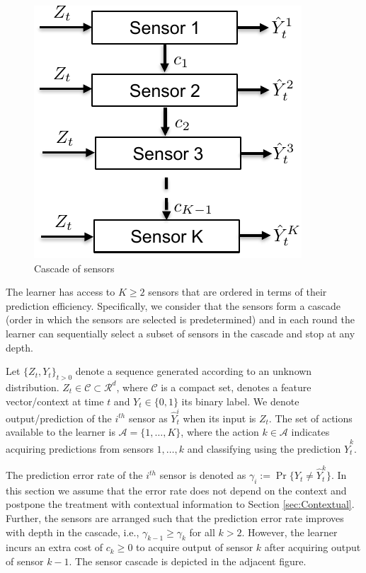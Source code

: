\documentclass{article}
\begin{document}
\begin{figure}
	\vspace{-.5cm}
	\centering
	\includegraphics[scale=.6]{SensorCascade.pdf}
	\caption{Cascade of sensors}\label{wrap-fig:1}
	\vspace{-.5cm}
\end{figure} 

The learner has access to $K\geq 2$ sensors that are ordered in terms of their prediction efficiency. Specifically, we consider that the sensors form a cascade (order in which the sensors are selected is predetermined) and in each round the learner can sequentially select a subset of sensors in the cascade and stop at any depth.  



Let $\{Z_t, Y_t\}_{{t>0}}$ denote a sequence generated according to an unknown distribution. $Z_t \in\mathcal{C} \subset  \mathcal{R}^d$, where $\mathcal{C}$ is a compact set, denotes a feature vector/context at time $t$ and $Y_t \in \{0,1\}$ its binary label. We denote output/prediction of the $i^{th}$ sensor as $\hat{Y}^i_t$ when its input is $Z_t$. The set of actions available to the learner is $\mathcal{A}=\{1,\ldots, K\}$, where  the action $k \in \mathcal{A}$ indicates acquiring predictions from sensors $1,\ldots, k$ and classifying using the prediction $\hat{Y}^k_t$. 




The prediction error rate of the $i^{th}$ sensor is denoted as $\gamma_i:=\Pr\{Y_t\neq \hat{Y}^k_t\}$. In this section we assume that the error rate does not depend on the  context and postpone the treatment with contextual information to Section \ref{sec:Contextual}. Further, the sensors are arranged such that the prediction error rate improves with depth in the cascade, i.e., $\gamma_{k-1}\geq \gamma_k$ for all $k>2$. However, the learner incurs an extra cost of $c_k\geq 0$ to acquire output of sensor $k$ after acquiring output of sensor $k-1$. The sensor cascade is depicted in the adjacent figure.
\end{document}

